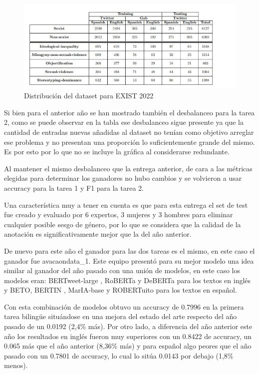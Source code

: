 \begin{figure}[H]
    \centering
    \includegraphics[width=16cm]{imagenes/Arte/dataset_exist2022.jpg}
    \caption{\centering Distribución del dataset para EXIST 2022}
\end{figure}

Si bien para el anterior año se han mostrado también el desbalanceo para la tarea 2, como se puede observar en la tabla ese desbalanceo sigue presente ya que la cantidad de entradas nuevas añadidas al dataset no tenían como objetivo arreglar ese problema y no presentan una proporción lo suficientemente grande del mismo. Es por esto por lo que no se incluye la gráfica al considerarse redundante. 

Al mantener el mismo desbalanceo que la entrega anterior, de cara a las métricas elegidas para determinar los ganadores no hubo cambios y se volvieron a usar accuracy para la tarea 1 y F1 para la tarea 2.

Una característica muy a tener en cuenta es que para esta entrega el set de test fue creado y evaluado por 6 expertos, 3 mujeres y 3 hombres para eliminar cualquier posible sesgo de género, por lo que se considera que la calidad de la anotación es significativamente mejor que la del año anterior.

De nuevo para este año el ganador para las dos tareas es el mismo, en este caso el ganador fue avacaondata\_1. Este equipo presentó para su mejor modelo una idea similar al ganador del año pasado con una unión de modelos, en este caso los modelos eran: BERTweet-large \cite{nguyen-etal-2020-bertweet}, RoBERTa y DeBERTa para los textos en inglés y BETO, BERTIN \cite{de2022bertin}, MarIA-base \cite{gutierrez2021spanish} y ROBERTuito para los textos en español. 

Con esta combinación de modelos obtuvo un accuracy de 0.7996 en la primera tarea bilingüe situándose en una mejora del estado del arte respecto del año pasado de un 0.0192 (2,4\% más). Por otro lado, a diferencia del año anterior este año los resultados en inglés fueron muy superiores con un 0.8422 de accuracy, un 0.065 más que el año anterior (8,36\% más) y para español algo peores que el año pasado con un 0.7801 de accuracy, lo cual lo sitúa 0.0143 por debajo (1,8\% menos). 

